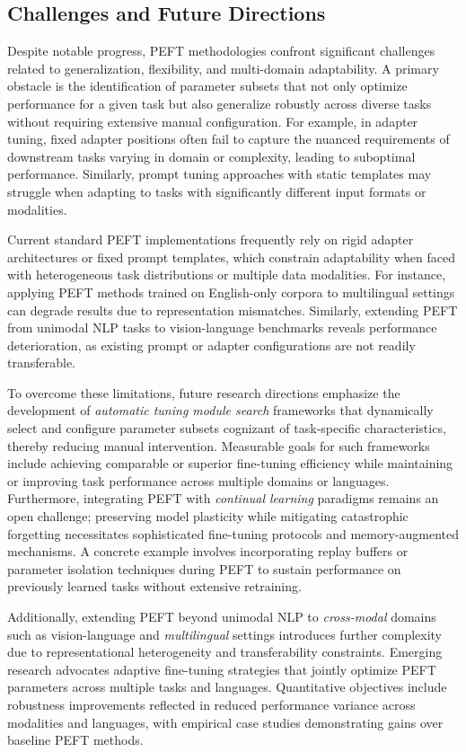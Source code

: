 \documentclass[sigconf]{acmart}
\begin{document}
\subsection{Challenges and Future Directions}

Despite notable progress, PEFT methodologies confront significant challenges related to generalization, flexibility, and multi-domain adaptability. A primary obstacle is the identification of parameter subsets that not only optimize performance for a given task but also generalize robustly across diverse tasks without requiring extensive manual configuration. For example, in adapter tuning, fixed adapter positions often fail to capture the nuanced requirements of downstream tasks varying in domain or complexity, leading to suboptimal performance. Similarly, prompt tuning approaches with static templates may struggle when adapting to tasks with significantly different input formats or modalities.

Current standard PEFT implementations frequently rely on rigid adapter architectures or fixed prompt templates, which constrain adaptability when faced with heterogeneous task distributions or multiple data modalities. For instance, applying PEFT methods trained on English-only corpora to multilingual settings can degrade results due to representation mismatches. Similarly, extending PEFT from unimodal NLP tasks to vision-language benchmarks reveals performance deterioration, as existing prompt or adapter configurations are not readily transferable.

To overcome these limitations, future research directions emphasize the development of \textit{automatic tuning module search} frameworks that dynamically select and configure parameter subsets cognizant of task-specific characteristics, thereby reducing manual intervention. Measurable goals for such frameworks include achieving comparable or superior fine-tuning efficiency while maintaining or improving task performance across multiple domains or languages. Furthermore, integrating PEFT with \textit{continual learning} paradigms remains an open challenge; preserving model plasticity while mitigating catastrophic forgetting necessitates sophisticated fine-tuning protocols and memory-augmented mechanisms. A concrete example involves incorporating replay buffers or parameter isolation techniques during PEFT to sustain performance on previously learned tasks without extensive retraining.

Additionally, extending PEFT beyond unimodal NLP to \textit{cross-modal} domains such as vision-language and \textit{multilingual} settings introduces further complexity due to representational heterogeneity and transferability constraints. Emerging research advocates adaptive fine-tuning strategies that jointly optimize PEFT parameters across multiple tasks and languages. Quantitative objectives include robustness improvements reflected in reduced performance variance across modalities and languages, with empirical case studies demonstrating gains over baseline PEFT methods.
\end{document}
